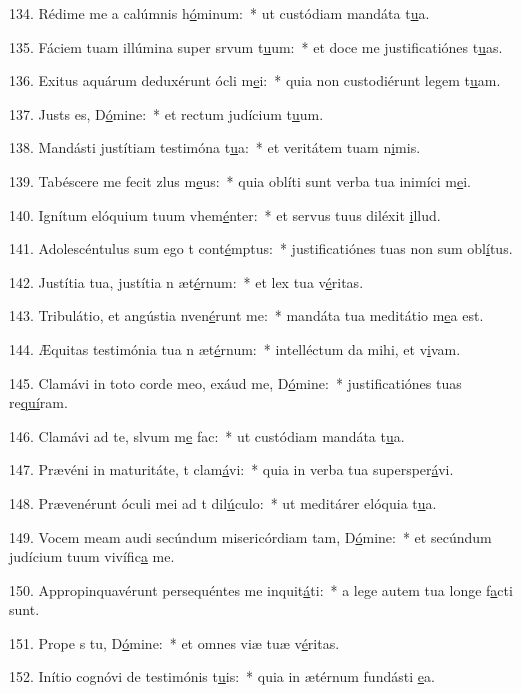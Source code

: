 134. Rédime me a calúmnis h\uline{ó}minum:~* ut custódiam mandáta t\uline{u}a.\par 
135. Fáciem tuam illúmina super srvum t\uline{u}um:~* et doce me justificatiónes t\uline{u}as.\par 
136. Exitus aquárum deduxérunt ócli m\uline{e}i:~* quia non custodiérunt legem t\uline{u}am.\par 
137. Justs es, D\uline{ó}mine:~* et rectum judícium t\uline{u}um.\par 
138. Mandásti justítiam testimóna t\uline{u}a:~* et veritátem tuam n\uline{i}mis.\par 
139. Tabéscere me fecit zlus m\uline{e}us:~* quia oblíti sunt verba tua inimíci m\uline{e}i.\par 
140. Ignítum elóquium tuum vhem\uline{é}nter:~* et servus tuus diléxit \uline{i}llud.\par 
141. Adolescéntulus sum ego t cont\uline{é}mptus:~* justificatiónes tuas non sum obl\uline{í}tus.\par 
142. Justítia tua, justítia n æt\uline{é}rnum:~* et lex tua v\uline{é}ritas.\par 
143. Tribulátio, et angústia nven\uline{é}runt me:~* mandáta tua meditátio m\uline{e}a est.\par 
144. Æquitas testimónia tua n æt\uline{é}rnum:~* intelléctum da mihi, et v\uline{i}vam.\par 
145. Clamávi in toto corde meo, exáud me, D\uline{ó}mine:~* justificatiónes tuas re\uline{quí}ram.\par 
146. Clamávi ad te, slvum m\uline{e} fac:~* ut custódiam mandáta t\uline{u}a.\par 
147. Prævéni in maturitáte, t clam\uline{á}vi:~* quia in verba tua supersper\uline{á}vi.\par 
148. Prævenérunt óculi mei ad t dil\uline{ú}culo:~* ut meditárer elóquia t\uline{u}a.\par 
149. Vocem meam audi secúndum misericórdiam tam, D\uline{ó}mine:~* et secúndum judícium tuum vivífic\uline{a} me.\par 
150. Appropinquavérunt persequéntes me inquit\uline{á}ti:~* a lege autem tua longe f\uline{a}cti sunt.\par 
151. Prope s tu, D\uline{ó}mine:~* et omnes viæ tuæ v\uline{é}ritas.\par 
152. Inítio cognóvi de testimónis t\uline{u}is:~* quia in ætérnum fundásti \uline{e}a.\par 

